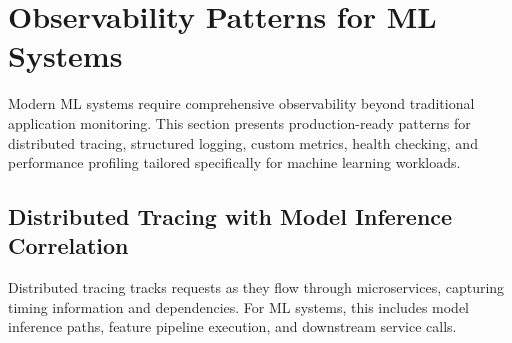 \section{Observability Patterns for ML Systems}

Modern ML systems require comprehensive observability beyond traditional application monitoring. This section presents production-ready patterns for distributed tracing, structured logging, custom metrics, health checking, and performance profiling tailored specifically for machine learning workloads.

\subsection{Distributed Tracing with Model Inference Correlation}

Distributed tracing tracks requests as they flow through microservices, capturing timing information and dependencies. For ML systems, this includes model inference paths, feature pipeline execution, and downstream service calls.


